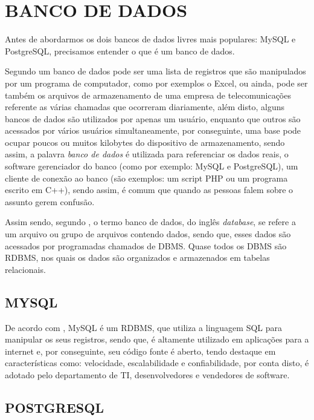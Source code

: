 \chapter{BANCO DE DADOS}
\label{bancoDeDados}

Antes de abordarmos os dois bancos de dados livres mais populares:
\acs{MySQL} e \acs{PostgreSQL}, precisamos entender o que é um banco de
dados.
 
Segundo  um banco de dados pode ser uma
lista de registros que são manipulados por um programa de computador, como por
exemplos o \acs{Excel}, ou ainda, pode ser também os arquivos de armazenamento
de uma empresa de telecomunicações referente as várias chamadas que ocorreram
diariamente, além disto, alguns bancos de dados são utilizados por apenas um
usuário, enquanto que outros são acessados por vários usuários
simultaneamente, por conseguinte, uma base pode ocupar poucos ou muitos
kilobytes do dispositivo de armazenamento, sendo assim, a palavra \textit{banco de dados} 
é utilizada para referenciar os dados reais, o software gerenciador do banco 
(como por exemplo: \acs{MySQL} e \acs{PostgreSQL}), um cliente de conexão 
ao banco (são exemplos:  um script PHP ou um programa escrito em C++), sendo 
assim, é comum que quando as pessoas falem sobre o assunto gerem confusão.

Assim sendo, segundo , o termo banco de dados, do inglês
\textit{database}, se refere a um arquivo ou grupo de arquivos contendo dados, 
sendo que, esses dados são acessados por programadas chamados de \ac{DBMS}.
Quase todos os \acs{DBMS} são \acs{RDBMS}, nos quais os dados são organizados e
armazenados em tabelas relacionais.

\section{MYSQL}

De acordo com , \acs{MySQL} é um
\ac{RDBMS},  que utiliza a linguagem \ac{SQL} para manipular os seus registros, 
sendo que, é altamente utilizado em aplicações para a internet e, por
conseguinte,  seu código fonte é aberto, tendo destaque em características
como: velocidade, escalabilidade e confiabilidade, por conta disto, é adotado
pelo departamento de \ac{TI}, desenvolvedores e vendedores de software.

\section{POSTGRESQL}

